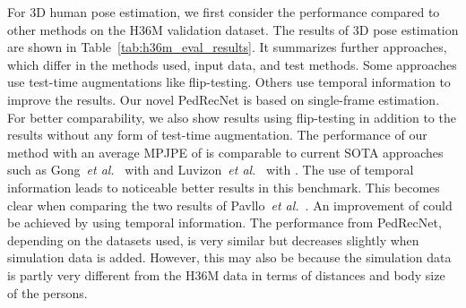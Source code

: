 \documentclass[a4paper, 10pt, conference]{ieeeconf}
\begin{document}
For 3D human pose estimation, we first consider the performance compared to other methods on the H36M validation dataset. The results of 3D pose estimation are shown in Table~\ref{tab:h36m_eval_results}. It summarizes further approaches, which differ in the methods used, input data, and test methods. Some approaches use test-time augmentations like flip-testing. Others use temporal information to improve the results. Our novel PedRecNet is based on single-frame estimation. For better comparability, we also show results using flip-testing in addition to the results without any form of test-time augmentation. The performance of our method with an average MPJPE of  is comparable to current SOTA approaches such as Gong~\textit{et al.}~\cite{gongPoseAugDifferentiablePose2021} with  and Luvizon~\textit{et al.}~\cite{luvizonMultitaskDeepLearning2020} with . The use of temporal information leads to noticeable better results in this benchmark. This becomes clear when comparing the two results of Pavllo~\textit{et al.}~\cite{pavllo3DHumanPose2019}. An improvement of  could be achieved by using temporal information. The performance from PedRecNet, depending on the datasets used, is very similar but decreases slightly when simulation data is added. However, this may also be because the simulation data is partly very different from the H36M data in terms of distances and body size of the persons.
\end{document}
